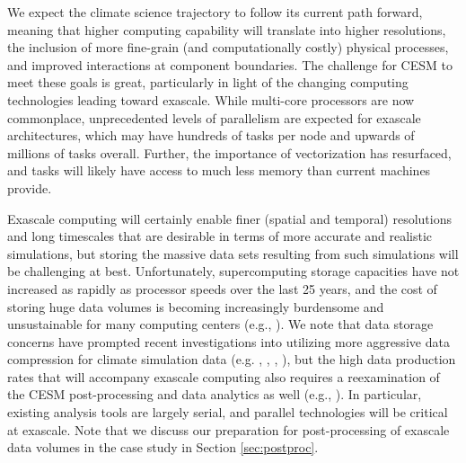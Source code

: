 We expect the climate science trajectory to follow its current path forward, meaning that higher computing capability will translate into higher resolutions, the inclusion of more fine-grain (and computationally costly) physical processes, and improved interactions at component boundaries. The challenge for CESM to meet these goals is great, particularly in light of the changing computing technologies leading toward exascale.  While multi-core processors are now commonplace, unprecedented levels of parallelism are expected for exascale architectures, which may have hundreds of tasks per node and upwards of millions of tasks overall.  Further, the importance of vectorization has resurfaced, and tasks will likely have access to much less memory than current machines provide.

Exascale computing will certainly enable finer (spatial and temporal) resolutions and long timescales that are desirable in terms of more accurate and realistic simulations, but storing the massive data sets resulting from such simulations will be challenging at best. Unfortunately, supercomputing storage capacities have not increased as rapidly as processor speeds over the last 25 years, and the cost of storing huge data volumes is becoming increasingly burdensome and unsustainable for many computing centers (e.g., \cite{kunkel2014}).  We note that data storage concerns have prompted recent investigations into utilizing more aggressive data compression for climate simulation data (e.g. \cite{baker2014}, \cite{baker2016-pepsi}, \cite{woodring11}, \cite{hubbe12}), but the high data production rates that will accompany exascale computing also requires a reexamination of the CESM post-processing and data analytics as well (e.g., \cite{paul2015}).  In particular, existing analysis tools are largely serial, and parallel technologies will be critical at exascale. 
Note that we discuss our preparation for post-processing of exascale data volumes in the case study in Section \ref{sec:postproc}.
